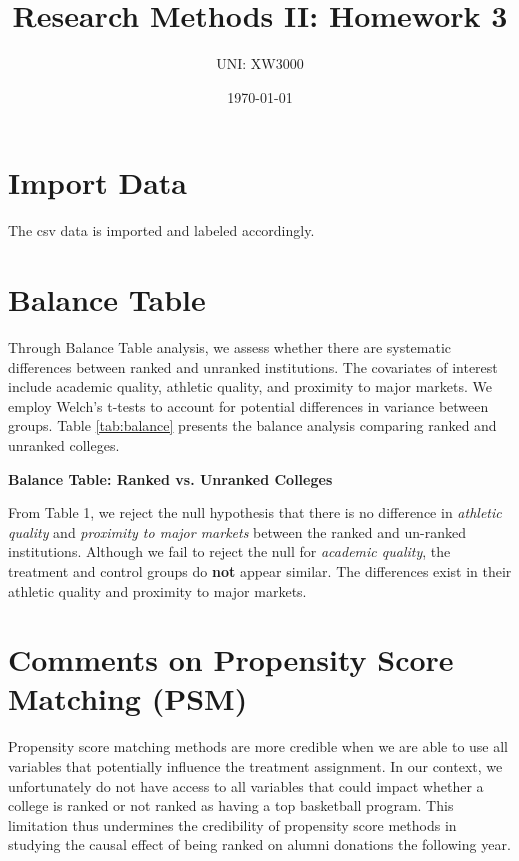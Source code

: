 \documentclass[12pt]{article}
\title{Research Methods II: Homework 3}
\author{UNI: XW3000}
\date{\today}
\begin{document}
\maketitle

\section{Import Data}

The csv data is imported and labeled accordingly. 

\section{Balance Table}

Through Balance Table analysis, we assess whether there are systematic differences between ranked and unranked institutions. The covariates of interest include academic quality, athletic quality, and proximity to major markets. We employ Welch's t-tests to account for potential differences in variance between groups. Table \ref{tab:balance} presents the balance analysis comparing ranked and unranked colleges.

\begin{table}[H]
    \begin{center} 
    \caption{\textbf{Balance Table: Ranked vs. Unranked Colleges}}
    \label{tab:balance}
    
    \end{center}
\end{table}

From Table 1, we reject the null hypothesis that there is no difference in \textit{athletic quality} and \textit{proximity to major markets} between the ranked and un-ranked institutions. Although we fail to reject the null for \textit{academic quality}, the treatment and control groups do \textbf{not} appear similar. The differences exist in their athletic quality and proximity to major markets.

\section{Comments on Propensity Score Matching (PSM)}

Propensity score matching methods are more credible when we are able to use all variables that potentially influence the treatment assignment. In our context, we unfortunately do not have access to all variables that could impact whether a college is ranked or not ranked as having a top basketball program. This limitation thus undermines the credibility of propensity score methods in studying the causal effect of being ranked on alumni donations the following year. 
\end{document}
